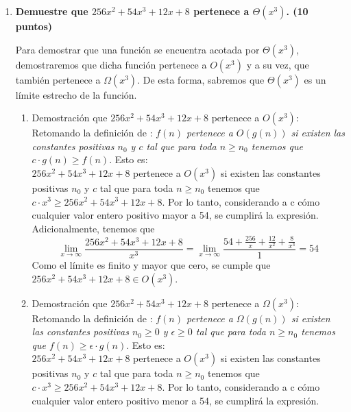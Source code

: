 \documentclass[a4paper,12pt]{article} %
\begin{document}
\begin{enumerate}
    \item \textbf{Demuestre que $256x^{2} + 54x^{3} + 12x + 8$ pertenece a $\Theta(x^{3})$. (\textbf{10 puntos})}

    Para demostrar que una función se encuentra acotada por $\Theta(x^{3})$, demostraremos que dicha función pertenece a $O(x^{3})$ y a su vez, que también pertenece a $\Omega(x^{3})$. De esta forma, sabremos que $\Theta(x^{3})$ es un límite estrecho de la función. 

    \begin{enumerate}
        \item  Demostración que $256x^{2} + 54x^{3} + 12x + 8$ pertenece a $O(x^{3})$:\\
        Retomando la definición de : \textit{$f(n)$ pertenece a $O(g(n))$ si existen las constantes positivas $n_0$ y $c$ tal que para toda $n\geq n_0$ tenemos que $c\cdot g(n) \geq f(n)$}. Esto es: \\
        
        $256x^{2} + 54x^{3} + 12x + 8$ pertenece a $O(x^{3})$ si existen las constantes positivas $n_0$ y $c$ tal que para toda $n\geq n_0$ tenemos que $c\cdot x^3 \geq 256x^{2} + 54x^{3} + 12x + 8$. Por lo tanto, considerando a c cómo cualquier valor entero positivo mayor a 54, se cumplirá la expresión.\\

        Adicionalmente, tenemos que \[ \lim_{{x \to \infty}} \frac{256x^{2} + 54x^{3} + 12x + 8}{x^{3}} = \lim_{{x \to \infty}} \frac{54 + \frac{256}{x} + \frac{12}{x^{2}} + \frac{8}{x^{3}}}{1} = 54 \]
        Como el límite es finito y mayor que cero, se cumple que $256x^{2} + 54x^{3} + 12x + 8 \in O(x^{3})$.


        \item Demostración que $256x^{2} + 54x^{3} + 12x + 8$ pertenece a $\Omega(x^{3})$:\\
        Retomando la definición de : \textit{$f(n)$ pertenece a $\Omega(g(n))$ si existen las constantes positivas $n_0 \geq 0$ y $\epsilon \ge 0$ tal que para toda $n\geq n_0$ tenemos que $f(n) \geq \epsilon \cdot g(n)$}. Esto es: \\

        $256x^{2} + 54x^{3} + 12x + 8$ pertenece a $O(x^{3})$ si existen las constantes positivas $n_0$ y $c$ tal que para toda $n\geq n_0$ tenemos que $c\cdot x^3 \geq 256x^{2} + 54x^{3} + 12x + 8$. Por lo tanto, considerando a c cómo cualquier valor entero positivo menor a 54, se cumplirá la expresión.


\end{enumerate}
\end{enumerate}
\end{document}
